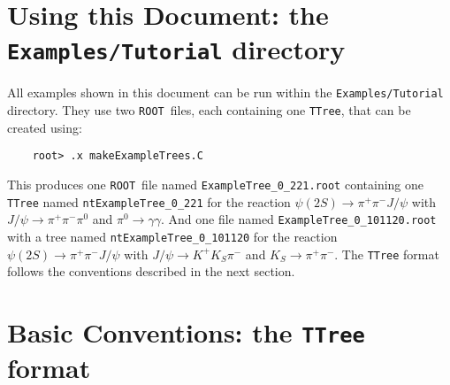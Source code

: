 \documentclass[11pt]{article}
\newcommand{\ROOT}{{\tt ROOT}}
\begin{document}
\section{Using this Document: the {\tt Examples/Tutorial} directory}
\label{sec:tutorial}

All examples shown in this document can be run within the {\tt Examples/Tutorial} directory.  They use two \ROOT\ files, each containing one {\tt TTree}, that can be created using:
\begin{verbatim}
    root> .x makeExampleTrees.C
\end{verbatim}
This produces one \ROOT\ file named {\tt ExampleTree\_0\_221.root} containing one {\tt TTree} named {\tt ntExampleTree\_0\_221} for the reaction
$\psi(2S)\to\pi^+\pi^-J/\psi$ with $J/\psi \to \pi^+\pi^-\pi^0$ and $\pi^0 \to \gamma \gamma$.  
And one file named {\tt ExampleTree\_0\_101120.root} with a tree named {\tt ntExampleTree\_0\_101120} for the reaction 
$\psi(2S)\to\pi^+\pi^-J/\psi$ with $J/\psi \to K^+K_S\pi^-$ and $K_S \to \pi^+\pi^-$.  The {\tt TTree} format follows the conventions described in the next section.

\section{Basic Conventions: the {\tt TTree} format}
\label{sec:conventions}
\end{document}
